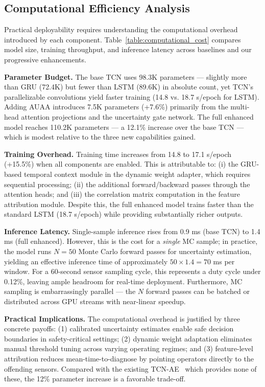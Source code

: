 

\subsection{Computational Efficiency Analysis}

Practical deployability requires understanding the computational overhead introduced by each component. Table~\ref{table:computational_cost} compares model size, training throughput, and inference latency across baselines and our progressive enhancements.



\textbf{Parameter Budget.} The base TCN uses 98.3K parameters — slightly more than GRU (72.4K) but fewer than LSTM (89.6K) in absolute count, yet TCN's parallelizable convolutions yield faster training (14.8 vs. 18.7 s/epoch for LSTM). Adding AUAA introduces 7.5K parameters (+7.6\%) primarily from the multi-head attention projections and the uncertainty gate network. The full enhanced model reaches 110.2K parameters — a 12.1\% increase over the base TCN — which is modest relative to the three new capabilities gained.

\textbf{Training Overhead.} Training time increases from 14.8 to 17.1 s/epoch (+15.5\%) when all components are enabled. This is attributable to: (i) the GRU-based temporal context module in the dynamic weight adapter, which requires sequential processing; (ii) the additional forward/backward passes through the attention heads; and (iii) the correlation matrix computation in the feature attribution module. Despite this, the full enhanced model trains faster than the standard LSTM (18.7 s/epoch) while providing substantially richer outputs.

\textbf{Inference Latency.} Single-sample inference rises from 0.9 ms (base TCN) to 1.4 ms (full enhanced). However, this is the cost for a \emph{single} MC sample; in practice, the model runs $N=50$ Monte Carlo forward passes for uncertainty estimation, yielding an effective inference time of approximately $50 \times 1.4 = 70$ ms per window. For a 60-second sensor sampling cycle, this represents a duty cycle under 0.12\%, leaving ample headroom for real-time deployment. Furthermore, MC sampling is embarrassingly parallel — the $N$ forward passes can be batched or distributed across GPU streams with near-linear speedup.

\textbf{Practical Implications.} The computational overhead is justified by three concrete payoffs: (1) calibrated uncertainty estimates enable safe decision boundaries in safety-critical settings; (2) dynamic weight adaptation eliminates manual threshold tuning across varying operating regimes; and (3) feature-level attribution reduces mean-time-to-diagnose by pointing operators directly to the offending sensors. Compared with the existing TCN-AE~\cite{thill_temporal_2021} which provides none of these, the 12\% parameter increase is a favorable trade-off.

